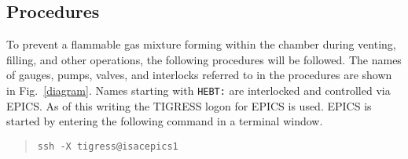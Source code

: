 
\lhead{}
\subsection{Procedures}
\label{procedures}
To prevent a flammable gas mixture forming within the chamber during venting, filling, and other operations,
the following procedures will be followed. The names of gauges, pumps, valves, and interlocks referred to in the procedures are shown in Fig.~\ref{diagram}. Names starting with \texttt{HEBT:} are interlocked and controlled via EPICS. As of this writing the TIGRESS logon for EPICS is used. EPICS is started by entering the following command in a terminal window.
\vsetlinux
\begin{quote}
\begin{Verbatim}
ssh -X tigress@isacepics1
\end{Verbatim}
\end{quote}
